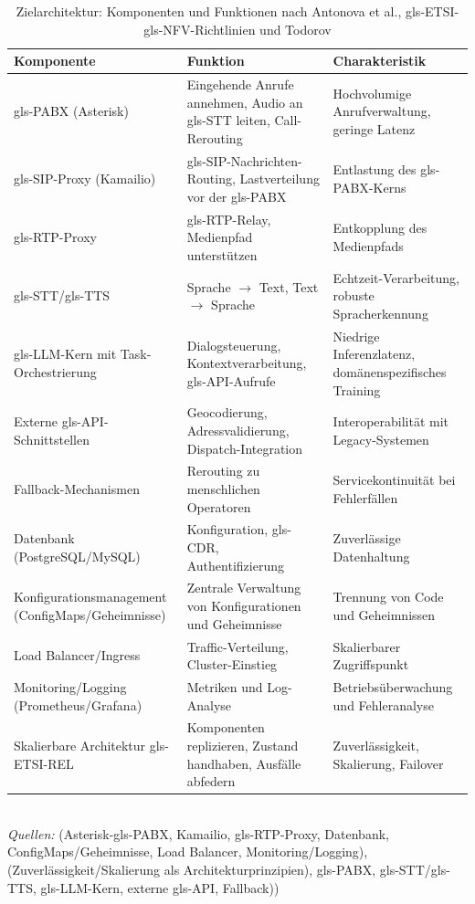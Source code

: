 \begin{table}[H]
\centering
\caption[Zielarchitektur-Komponenten]{Zielarchitektur: Komponenten und Funktionen nach Antonova et al., \gls{gls-ETSI}-\gls{gls-NFV}-Richtlinien und Todorov \parencite{Antonova2025, ETSI-REL, Todorov2025LLMDispatcher}}
\label{tab:vnf_components}
\small
\begin{tabular}{|>{\raggedright\arraybackslash}p{3.6cm}|>{\raggedright\arraybackslash}p{5.3cm}|>{\raggedright\arraybackslash}p{4.1cm}|}
\hline
\textbf{Komponente} & \textbf{Funktion} & \textbf{Charakteristik} \\
\hline
\gls{gls-PABX} (Asterisk) & Eingehende Anrufe annehmen, Audio an \gls{gls-STT} leiten, Call-Rerouting & Hochvolumige Anrufverwaltung, geringe Latenz \\
\hline
\gls{gls-SIP}-Proxy (Kamailio) & \gls{gls-SIP}-Nachrichten-Routing, Lastverteilung vor der \gls{gls-PABX} & Entlastung des \gls{gls-PABX}-Kerns \\
\hline
\gls{gls-RTP}-Proxy & \gls{gls-RTP}-Relay, Medienpfad unterstützen & Entkopplung des Medienpfads \\
\hline
\gls{gls-STT}/\gls{gls-TTS} & Sprache $\rightarrow$ Text, Text $\rightarrow$ Sprache & Echtzeit-Verarbeitung, robuste Spracherkennung \\
\hline
\gls{gls-LLM}-Kern mit Task-Orchestrierung & Dialogsteuerung, Kontextverarbeitung, \gls{gls-API}-Aufrufe & Niedrige Inferenzlatenz, domänenspezifisches Training \\
\hline
Externe \gls{gls-API}-Schnittstellen & Geocodierung, Adressvalidierung, Dispatch-Integration & Interoperabilität mit Legacy-Systemen \\
\hline
Fallback-Mechanismen & Rerouting zu menschlichen Operatoren & Servicekontinuität bei Fehlerfällen \\
\hline
Datenbank (PostgreSQL/MySQL) & Konfiguration, \gls{gls-CDR}, Authentifizierung & Zuverlässige Datenhaltung \\
\hline
Konfigurationsmanagement (ConfigMaps/Geheimnisse) & Zentrale Verwaltung von Konfigurationen und Geheimnisse & Trennung von Code und Geheimnissen \\
\hline
Load Balancer/Ingress & Traffic-Verteilung, Cluster-Einstieg & Skalierbarer Zugriffspunkt \\
\hline
Monitoring/Logging (Prometheus/Grafana) & Metriken und Log-Analyse & Betriebsüberwachung und Fehleranalyse \\
\hline
Skalierbare Architektur \gls{gls-ETSI}-REL & Komponenten replizieren, Zustand handhaben, Ausfälle abfedern & Zuverlässigkeit, Skalierung, Failover \\
\hline
\end{tabular}
\\[1em]
\footnotesize{\textit{Quellen:} \textcite{Antonova2025} (Asterisk-\gls{gls-PABX}, Kamailio, \gls{gls-RTP}-Proxy, Datenbank, ConfigMaps/Geheimnisse, Load Balancer, Monitoring/Logging), \textcite{ETSI-REL} (Zuverlässigkeit/Skalierung als Architekturprinzipien), \textcite{Todorov2025LLMDispatcher} \gls{gls-PABX}, \gls{gls-STT}/\gls{gls-TTS}, \gls{gls-LLM}-Kern, externe \gls{gls-API}, Fallback))}
\end{table}
\FloatBarrier

